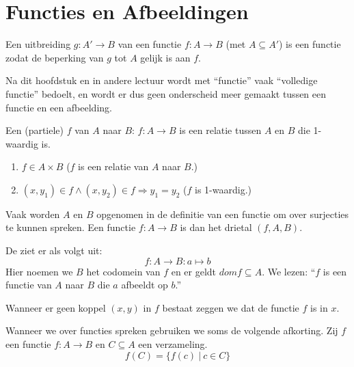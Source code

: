 \documentclass[main.tex]{subfiles}
\begin{document}
\chapter{Functies en Afbeeldingen}
\label{cha:functies}

\begin{de}
  Een uitbreiding $g:A' \rightarrow B$ van een functie $f:A \rightarrow B$ (met $A \subseteq A'$) is een functie zodat de beperking van $g$ tot $A$ gelijk is aan $f$.
\end{de}

\begin{opm}
  Na dit hoofdstuk en in andere lectuur wordt met ``functie'' vaak ``volledige functie'' bedoelt, en wordt er dus geen onderscheid meer gemaakt tussen een functie en een afbeelding.
\end{opm}

\begin{de}
  Een (partiele)  $f$ van $A$ naar $B$: $f: A \rightarrow B$ is een relatie tussen $A$ en $B$ die 1-waardig is.
  \begin{enumerate}
  \item $f \in A \times B$ ($f$ is een relatie van $A$ naar $B$.)
  \item $(x,y_{1}) \in f \wedge (x,y_{2}) \in f \Rightarrow y_{1} = y_{2}$ ($f$ is 1-waardig.)
  \end{enumerate}
  Vaak worden $A$ en $B$ opgenomen in de definitie van een functie om over surjecties te kunnen spreken. Een functie $f: A \rightarrow B$ is dan het drietal $(f,A,B)$.
\end{de}

\begin{de}
  De  ziet er als volgt uit:
  \[ f: A \rightarrow B: a \mapsto b \]
  Hier noemen we $B$ het codomein van $f$ en er geldt $dom f \subseteq A$.
  We lezen: ``$f$ is een functie van $A$ naar $B$ die $a$ afbeeldt op $b$.''
\end{de}

\begin{de}
  Wanneer er geen koppel $(x,y)$ in $f$ bestaat zeggen we dat de functie $f$  is in $x$.
\end{de}

\begin{de}
  Wanneer we over functies spreken gebruiken we soms de volgende afkorting. Zij $f$ een functie $f: A \rightarrow B$ en $C \subseteq A$ een verzameling.
  \[ f(C) = \{ f(c)\ |\ c \in C \} \] 
\end{de}
\end{document}
